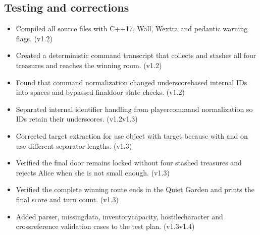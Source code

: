 \documentclass[letterpaper,10pt,english]{sphinxmanual}
\begin{document}
\subsection{Testing and corrections}
\label{\detokenize{AssignmentFour/main:testing-and-corrections}}\begin{itemize}
\item {} 
\sphinxAtStartPar
Compiled all source files with C++17, Wall, Wextra and pedantic warning flags. (v1.2)

\item {} 
\sphinxAtStartPar
Created a deterministic command transcript that collects and stashes all four treasures and reaches the winning room. (v1.2)

\item {} 
\sphinxAtStartPar
Found that command normalization changed underscore\sphinxhyphen{}based internal IDs into spaces and bypassed final\sphinxhyphen{}door state checks. (v1.2)

\item {} 
\sphinxAtStartPar
Separated internal identifier handling from player\sphinxhyphen{}command normalization so IDs retain their underscores. (v1.2\sphinxhyphen{}v1.3)

\item {} 
\sphinxAtStartPar
Corrected target extraction for use object with target because with and on use different separator lengths. (v1.3)

\item {} 
\sphinxAtStartPar
Verified the final door remains locked without four stashed treasures and rejects Alice when she is not small enough. (v1.3)

\item {} 
\sphinxAtStartPar
Verified the complete winning route ends in the Quiet Garden and prints the final score and turn count. (v1.3)

\item {} 
\sphinxAtStartPar
Added parser, missing\sphinxhyphen{}data, inventory\sphinxhyphen{}capacity, hostile\sphinxhyphen{}character and cross\sphinxhyphen{}reference validation cases to the test plan. (v1.3\sphinxhyphen{}v1.4)

\end{itemize}
\end{document}
